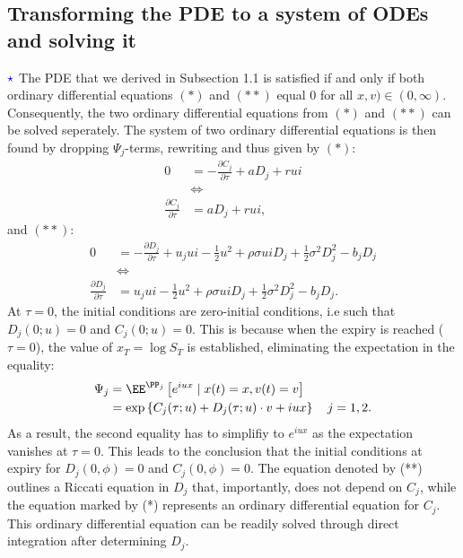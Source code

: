 \documentclass[12pt]{article}
\numberwithin{equation}{section}
\newcommand{\lc}{\left\{}
\newcommand{\rc}{\right\}}
\begin{document}
\subsection{Transforming the PDE to a system of ODEs and solving it}
$\textcolor{blue}{\star}$ The PDE that we derived in Subsection 1.1 is satisfied if and only if both
ordinary differential equations $(*)$ and $(**)$ equal $0$ for all $x,v)\in (0,\infty)$. Consequently, the
two ordinary differential equations from $(*)$ and $(**)$ can be solved
seperately. The system of two ordinary differential equations is then found by dropping
$\Psi_j$-terms, rewriting and thus given by $(*)$:
\begin{align*}
    0&=-\frac{\partial C_j}{\partial \tau}+aD_j+rui\\&\iff \\ \frac{\partial C_j}{\partial \tau}&=aD_j+rui,
\end{align*}
and $(**)$:
\begin{align*}
    0&=-\frac{\partial D_j}{\partial \tau}+u_jui-\frac{1}{2}u^2+\rho\sigma u iD_j+\frac{1}{2}\sigma^2D_j^2-b_jD_j\\ &\iff \\ \frac{\partial D_j}{\partial \tau}&=u_jui-\frac{1}{2}u^2+\rho\sigma u iD_j+\frac{1}{2}\sigma^2D_j^2-b_jD_j.
\end{align*}
At $\tau=0$, the initial conditions are
zero-initial conditions, i.e such that $D_j(0;u)=0$ and $C_j(0;u) =0$. This is
because when the expiry is reached ($\tau = 0$), the value of $x_T = \log S_T$ is
established, eliminating the expectation in the equality:
\begin{align*}
    \Psi_j&=\EE^{\PP_j} \left [ e^{iux}  \mid x(t)=x,v(t)=v \right]\\
    &=\exp \lc C_j (\tau; u) + D_j (\tau; u) \cdot v + i  u x \rc \quad j=1,2.
\end{align*}
As a result, the second equality has to simplifiy to $e^{iu x}$ as the
expectation vanishes at $\tau=0$. This leads to
the conclusion that the initial conditions at expiry for $D_j (0,\phi) = 0$
and $C_j (0,\phi) = 0$. The equation denoted by (**) outlines a Riccati equation
in $D_j$ that, importantly, does not depend on $C_j$, while the
equation marked by (*) represents an ordinary differential equation for $C_j$.
This ordinary differential equation can be readily solved through direct
integration after determining $D_j$.
\end{document}
